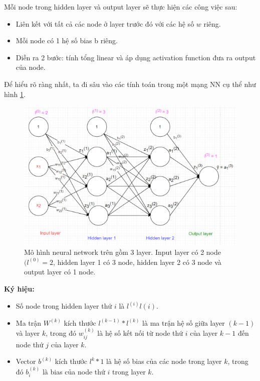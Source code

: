 Mỗi node trong hidden layer và output layer sẽ thực hiện các công việc sau:
\begin{itemize}
\item Liên kết với tất cả các node ở layer trước đó với các hệ số $w$ riêng.
\item Mỗi node có 1 hệ số bias b riêng.
\item Diễn ra 2 bước: tính tổng linear và áp dụng activation function đưa ra output của node.
\end{itemize}

Để hiểu rõ ràng nhất, ta đi sâu vào các tính toán trong một mạng NN cụ thể như hình \ref{fig:NN}.\\

\FloatBarrier
\begin{figure}[htp]
\begin{center}
\includegraphics[scale=1]{chap2/c2_figs/nn_full-2.png}
\end{center}
\caption{Mô hình neural network trên gồm 3 layer. Input layer có 2 node $(l^{(0)} = 2$, hidden layer 1 có 3 node, hidden layer 2 có 3 node và output layer có 1 node.}
\label{fig:NN}
\end{figure}
\FloatBarrier

\textbf{Ký hiệu:}
\begin{itemize}
\item Số node trong hidden layer thứ $i$ là $l^{(i)}l(i)$.

\item Ma trận $W^{(k)}$ kích thước $l^{(k-1)}*l^{(k)}$ là ma trận hệ số giữa layer $(k-1)$ và layer $k$, trong đó $w_{ij}^{(k)}$ là hệ số kết nối từ node thứ $i$ của layer $k-1$ đến node thứ $j$ của layer $k$.

\item Vector $b^{(k)}$ kích thước $l^{k} * 1$ là hệ số bias của các node trong layer $k$, trong đó $b_i^{(k)}$ là bias của node thứ $i$ trong layer $k$. 
\end{itemize}

